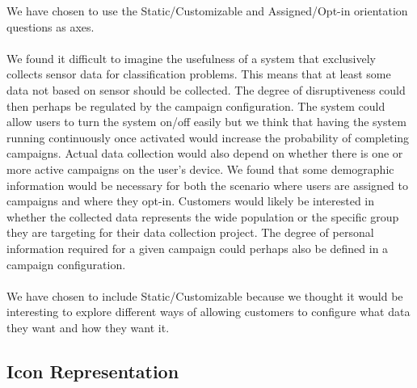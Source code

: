 We have chosen to use the Static/Customizable and Assigned/Opt-in orientation questions as axes. 
\\\\
We found it difficult to imagine the usefulness of a system that exclusively collects sensor data for classification problems. This means that at least some data not based on sensor should be collected. The degree of disruptiveness could then perhaps be regulated by the campaign configuration. 
The system could allow users to turn the system on/off easily but we think that having the system running continuously once activated would increase the probability of completing campaigns. Actual data collection would also depend on whether there is one or more active campaigns on the user's device.
We found that some demographic information would be necessary for both the scenario where users are assigned to campaigns and where they opt-in. Customers would likely be interested in whether the collected data represents the wide population or the specific group they are targeting for their data collection project. The degree of personal information required for a given campaign could perhaps also be defined in a campaign configuration. 
\\\\
We have chosen to include Static/Customizable because we thought it would be interesting to explore different ways of allowing customers to configure what data they want and how they want it. %











\subsection{Icon Representation}
\label{sub:icon_representation}


